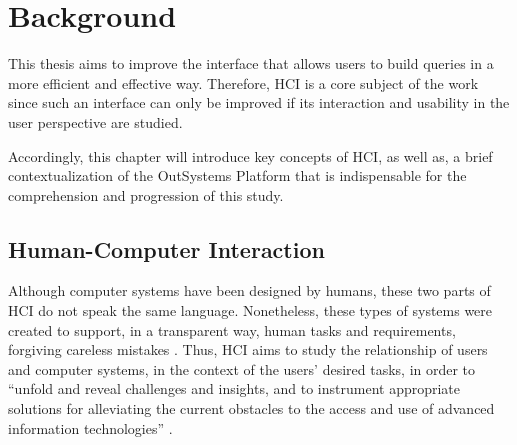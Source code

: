 \chapter{Background}
\label{cha:background}
This thesis aims to improve the interface that allows users to build queries in a more efficient and effective way. Therefore, \gls{HCI} is a core subject of the work since such an interface can only be improved if its interaction and usability in the user perspective are studied.

Accordingly, this chapter will introduce key concepts of \gls{HCI}, as well as, a brief contextualization of the OutSystems Platform that is indispensable for the comprehension and progression of this study.

\section{Human-Computer Interaction}
\label{sec:human_computer_interaction}
Although computer systems have been designed by humans, these two parts of \gls{HCI} do not speak the same language. Nonetheless, these types of systems were created to support, in a transparent way, human tasks and requirements, forgiving careless mistakes \cite{humanComputerInteraction}. Thus, \gls{HCI} aims to study the relationship of users and computer systems, in the context of the users’ desired tasks, in order to “unfold and reveal challenges and insights, and to instrument appropriate solutions for alleviating the current obstacles to the access and use of advanced information technologies” \cite{userInterfacesForAll_newPerspectivesIntoHumanComputerInteraction}. 




